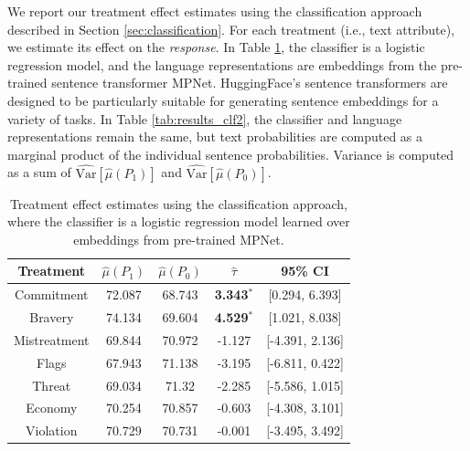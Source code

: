 \documentclass{article}
\begin{document}
We report our treatment effect estimates using the classification approach described in Section \ref{sec:classification}. For each treatment (i.e., text attribute), we estimate its effect on the \textit{response}. In Table \ref{tab:results_clf1}, the classifier is a logistic regression model, and the language representations are embeddings from the pre-trained sentence transformer MPNet. HuggingFace's sentence transformers are designed to be particularly suitable for generating sentence embeddings for a variety of tasks. In Table \ref{tab:results_clf2}, the classifier and language representations remain the same, but text probabilities are computed as a marginal product of the individual sentence probabilities. Variance is computed as a sum of $\widehat{\text{Var}}[\hat{\mu}(P_1)]$ and $\widehat{\text{Var}}[\hat{\mu}(P_0)]$.

\begin{table}[!ht]
    \centering
    \begin{tabular}{c|cccc}
        \toprule
        Treatment & $\hat{\mu}(P_1)$ & $\hat{\mu}(P_0)$ & $\hat{\tau}$ & 95\% CI \\
        \midrule
        Commitment & 72.087 & 68.743 & \textbf{\textcolor{green!50!black}{3.343$^*$}} & [0.294, 6.393] \\
        Bravery & 74.134 & 69.604 & \textbf{\textcolor{green!50!black}{4.529$^*$}} & [1.021, 8.038] \\
        Mistreatment & 69.844 & 70.972 & \textcolor{red!80!black}{-1.127} & [-4.391, 2.136] \\
        Flags & 67.943 & 71.138 & \textcolor{red!80!black}{-3.195} & [-6.811, 0.422] \\
        Threat & 69.034 & 71.32 & \textcolor{red!80!black}{-2.285} & [-5.586, 1.015]  \\
        Economy & 70.254 & 70.857 & \textcolor{red!80!black}{-0.603} & [-4.308, 3.101] \\
        Violation & 70.729 & 70.731 & \textcolor{red!80!black}{-0.001} & [-3.495, 3.492] \\
        \bottomrule
    \end{tabular}
    \caption{Treatment effect estimates using the classification approach, where the classifier is a logistic regression model learned over embeddings from pre-trained MPNet.}
    \label{tab:results_clf1}
\end{table}
\end{document}
